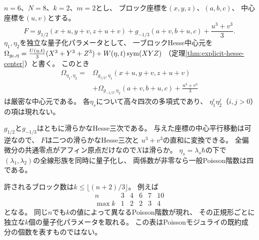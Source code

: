 \begin{example}[共通中心変数を持つ六次元cubicと独立な二方向]
\label{ex:pg-ad-sixfold}
$n=6$、$N=8$、$k=2$、$m=2$とし、
ブロック座標を$(x,y,z)$、$(a,b,c)$、
中心座標を$(u,v)$とする。
\begin{equation}
 F=
 g_{1/2}(x+u,y+v,z+u+v)
 +g_{-1/3}(a+v,b+u,c)
 +\frac{u^3+v^3}{3}.
\end{equation}
$\eta_1,\eta_2$を独立な量子化パラメータとして、
一ブロックHesse中心元を
$\Omega_{g_t,\eta}=\frac{U(\eta,t)}3(X^3+Y^3+Z^3)
 +W(\eta,t)\operatorname{sym}(XYZ)$
（定理\ref{thm:explicit-hesse-center}）と書く。
このとき
\begin{equation}
\begin{split}
\Omega_{\eta_1,\eta_2}={}&
 \Omega_{g_{1/2},\eta_1}(x+u,y+v,z+u+v)\\
 &+\Omega_{g_{-1/3},\eta_2}(a+v,b+u,c)
 +\frac{u^3+v^3}{3}
\end{split}
\end{equation}
は厳密な中心元である。
各$\eta_s$について高々四次の多項式であり、
$\eta_1^i\eta_2^j$（$i,j>0$）の項は現れない。

$g_{1/2}$と$g_{-1/3}$はともに滑らかなHesse三次である。
与えた座標の中心平行移動は可逆なので、
$F$は二つの滑らかなHesse三次と
$u^3+v^3$の直和に変換できる。
全偏微分の共通零点がアフィン原点だけなので$X$は滑らか。
$\eta_s=\lambda_s\hbar$の下で
$(\lambda_1,\lambda_2)$の全線形族を同時に量子化し、
両係数が非零なら一般Poisson階数は四である。
\end{example}

\begin{remark}[次元と独立パラメータ数]
\label{rem:pg-ad-dimension-table}
許されるブロック数は$k\le\lfloor(n+2)/3\rfloor$。
例えば
\begin{equation}
\begin{array}{c|ccccc}
 n&3&4&6&7&10\\ \hline
 \max k&1&2&2&3&4
\end{array}
\end{equation}
となる。
同じ$n$でも$k$の値によって異なるPoisson階数が現れ、
その正規形ごとに独立な$k$個の量子化パラメータを取れる。
この表はPoissonモジュライの既約成分の個数を表すものではない。
\end{remark}

